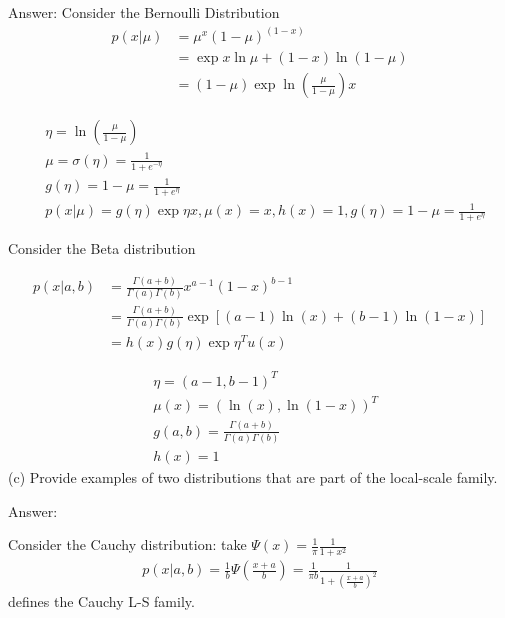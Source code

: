 \documentclass{article}
\begin{document}
Answer:
Consider the Bernoulli Distribution
\begin{equation}
\begin{aligned}
  p(x|\mu) & =  \mu^{x}(1-\mu)^(1-x) \\
  & = \exp{x\ln{\mu}+(1-x)\ln\left(1-\mu\right)} \\
  & = (1-\mu)\exp{\ln\left(\frac{\mu}{1-\mu}\right)x}
\end{aligned}
\end{equation}

\begin{equation}
\begin{aligned}
&\eta = \ln\left(\frac{\mu}{1-\mu}\right) \\
&\mu = \sigma(\eta)= \frac{1}{1+e^{-\eta}} \\
& g(\eta) = 1-\mu = \frac{1}{1+e^{\eta}} \\
& p(x|\mu) = g(\eta)\exp{\eta x}, \mu(x)= x, h(x)=1,g(\eta) = 1-\mu = \frac{1}{1+e^{\eta}}
\end{aligned}
\end{equation}

Consider the Beta distribution

\begin{equation}
\begin{aligned}
  p(x|a,b) & =  \frac{\Gamma(a+b)}{\Gamma(a)\Gamma(b)} x^{a-1}(1-x)^{b-1} \\
  & = \frac{\Gamma(a+b)}{\Gamma(a)\Gamma(b)} \exp[(a-1)\ln(x) + (b-1)\ln(1-x)] \\
  & = h(x)g(\eta)\exp{\eta^{T}u(x)}
\end{aligned}
\end{equation}

\begin{equation}
\begin{aligned}
&\eta = (a-1,b-1)^{T} \\
&\mu(x) = (\ln(x),\ln(1-x))^{T} \\
& g(a,b) = \frac{\Gamma(a+b)}{\Gamma(a)\Gamma(b)} \\
& h(x)=1
\end{aligned}
\end{equation}
\newline
(c) Provide examples of two distributions that are part of the local-scale family.

Answer:

Consider the Cauchy distribution:
take $\Psi(x) = \frac{1}{\pi}\frac{1}{1+x^2}$
\begin{equation}
\begin{aligned}
p(x|a,b) = \frac{1}{b}\Psi\left(\frac{x+a}{b}\right) = \frac{1}{\pi b}\frac{1}{1+\left(\frac{x+a}{b}\right)^2}
\end{aligned}
\end{equation}
defines the Cauchy L-S family.
\end{document}

